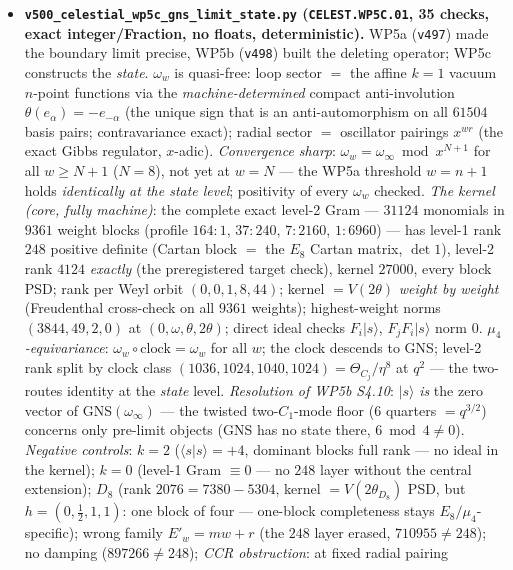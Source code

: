 \documentclass[11pt]{article}
\begin{document}
\begin{itemize}[leftmargin=1.5em]
\item \textbf{\texttt{v500\_celestial\_wp5c\_gns\_limit\_state.py} (\texttt{CELEST.WP5C.01}, 35
checks, exact integer/Fraction, no floats, deterministic).} WP5a (\texttt{v497}) made the boundary
limit precise, WP5b (\texttt{v498}) built the deleting operator; WP5c constructs the \emph{state}.
$\omega_w$ is quasi-free: loop sector $=$ the affine $k{=}1$ vacuum $n$-point functions via the
\emph{machine-determined} compact anti-involution $\theta(e_\alpha)={-}e_{-\alpha}$ (the unique sign
that is an anti-automorphism on all $61504$ basis pairs; contravariance exact); radial sector $=$
oscillator pairings $x^{wr}$ (the exact Gibbs regulator, $x$-adic). \emph{Convergence sharp}:
$\omega_w=\omega_\infty\bmod x^{N+1}$ for all $w\ge N{+}1$ ($N{=}8$), not yet at $w=N$ --- the WP5a
threshold $w=n{+}1$ holds \emph{identically at the state level}; positivity of every $\omega_w$
checked. \emph{The kernel (core, fully machine)}: the complete exact level-2 Gram --- $31124$
monomials in $9361$ weight blocks (profile $164{:}1$, $37{:}240$, $7{:}2160$, $1{:}6960$) --- has
level-1 rank $248$ positive definite (Cartan block $=$ the $E_8$ Cartan matrix, $\det1$), level-2
rank $4124$ \emph{exactly} (the preregistered target check), kernel $27000$, every block PSD; rank
per Weyl orbit $(0,0,1,8,44)$; kernel $=V(2\theta)$ \emph{weight by weight} (Freudenthal cross-check
on all $9361$ weights); highest-weight norms $(3844,49,2,0)$ at $(0,\omega,\theta,2\theta)$; direct
ideal checks $F_i|s\rangle$, $F_jF_i|s\rangle$ norm $0$. \emph{$\mu_4$-equivariance}:
$\omega_w\circ\text{clock}=\omega_w$ for all $w$; the clock descends to GNS; level-2 rank split by
clock class $(1036,1024,1040,1024)=\Theta_{C_j}/\eta^8$ at $q^2$ --- the two-routes identity at the
\emph{state} level. \emph{Resolution of WP5b S4.10}: $|s\rangle$ \emph{is} the zero vector of
GNS$(\omega_\infty)$ --- the twisted two-$C_1$-mode floor ($6$ quarters $=q^{3/2}$) concerns only
pre-limit objects (GNS has no state there, $6\bmod4\neq0$). \emph{Negative controls}: $k{=}2$
($\langle s|s\rangle={+}4$, dominant blocks full rank --- no ideal in the kernel); $k{=}0$ (level-1
Gram $\equiv0$ --- no $248$ layer without the central extension); $D_8$ (rank $2076=7380-5304$,
kernel $=V(2\theta_{D_8})$ PSD, but $h=(0,\tfrac12,1,1)$: one block of four --- one-block
completeness stays $E_8/\mu_4$-specific); wrong family $E'_w=mw{+}r$ (the $248$ layer erased,
$710955\neq248$); no damping ($897266\neq248$); \emph{CCR obstruction}: at fixed radial pairing

\end{itemize}
\end{document}
